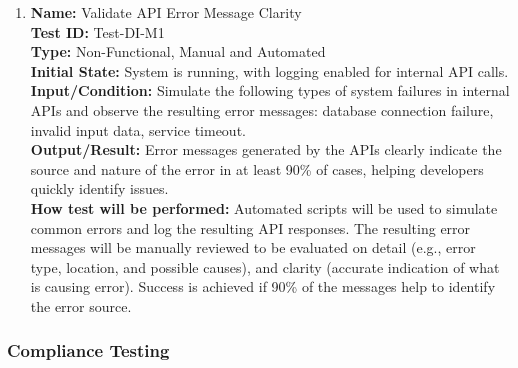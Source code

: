 \documentclass[12pt, titlepage]{article}
\begin{document}
\begin{enumerate}

\item \textbf{Name:} Validate API Error Message Clarity \label{itm:Test-DI-M1} \\
    \textbf{Test ID:} Test-DI-M1 \\
    \textbf{Type:} Non-Functional, Manual and Automated \\
    \textbf{Initial State:} System is running, with logging enabled for internal API calls. \\
    \textbf{Input/Condition:} Simulate the following types of system failures in internal APIs and observe the resulting error messages: database connection failure, invalid input data, service timeout. \\
    \textbf{Output/Result:} Error messages generated by the APIs clearly indicate the source and nature of the error in at least 90\% of cases, helping developers quickly identify issues. \\
    \textbf{How test will be performed:} Automated scripts will be used to simulate common errors and log the resulting API responses. The resulting error messages will be manually reviewed to be evaluated on detail (e.g., error type, location, and possible causes), and clarity (accurate indication of what is causing error). Success is achieved if 90\% of the messages help to identify the error source.


\end{enumerate}
\subsubsection{Compliance Testing}
\end{document}
